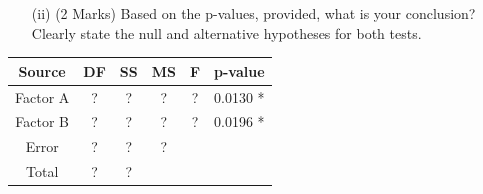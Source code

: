\documentclass[a4paper,12pt]{article}
\begin{document}
\begin{itemize}
\begin{itemize}
		\item[(ii)] (2 Marks) Based on the p-values, provided, what is your conclusion? Clearly state the null and alternative hypotheses for both tests.
	\end{itemize}
	
	\begin{center}
		\begin{tabular}{|c||c|c|c|c|l|}
			\hline Source & DF & SS & MS & F & p-value \\ \hline 
		 Factor A & \phantom{mak} ? \phantom{mak}  & \phantom{mak} ? \phantom{mak}  & \phantom{mak} ? \phantom{mak}  & \phantom{mak} ? \phantom{mak}  &0.0130 * \\ 
			\hline Factor B & \phantom{mak} ? \phantom{mak}  & \phantom{mak} ? \phantom{mak}  & \phantom{mak} ? \phantom{mak}  & \phantom{mak} ? \phantom{mak}  & 0.0196 *    \\ \hline
		Error &  ? & ? & \phantom{mak} ? \phantom{mak}  &  &  \\ 
			\hline \hline Total & ? & ? &  &  &  \\ 
			\hline 
		\end{tabular}
	\end{center} 





\end{itemize}
\end{document}
